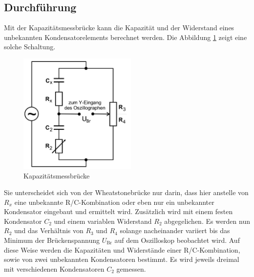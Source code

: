 \subsection{Durchführung}
Mit der Kapazitätsmessbrücke kann die Kapazität und der Widerstand eines unbekannten Kondensatorelements berechnet werden.
Die Abbildung \ref{fig:2} zeigt eine solche Schaltung.
\begin{figure}[H]
  \centering
  \includegraphics[height=6cm]{kapa.png}
  \caption{Kapazitätsmessbrücke \cite{sample}}
  \label{fig:2}
\end{figure}
Sie unterscheidet sich von der Wheatstonebrücke nur darin, dass hier anstelle von $R_x$ eine unbekannte R/C-Kombination oder eben nur ein unbekannter Kondensator eingebaut und ermittelt wird.
Zusätzlich wird mit einem festen Kondensator $C_2$ und einem variablen Widerstand $R_2$ abgegelichen.
Es werden nun $R_2$ und das Verhältnis von $R_3$ und $R_4$ solange nacheinander variiert bis das Minimum der Brückenspannung $U_{\text{Br}}$ auf dem Oszilloskop beobachtet wird.
Auf diese Weise werden die Kapazitäten und Widerstände einer R/C-Kombination, sowie von zwei unbekannten Kondensatoren bestimmt.
Es wird jeweils dreimal mit verschiedenen Kondensatoren $C_2$ gemessen.
